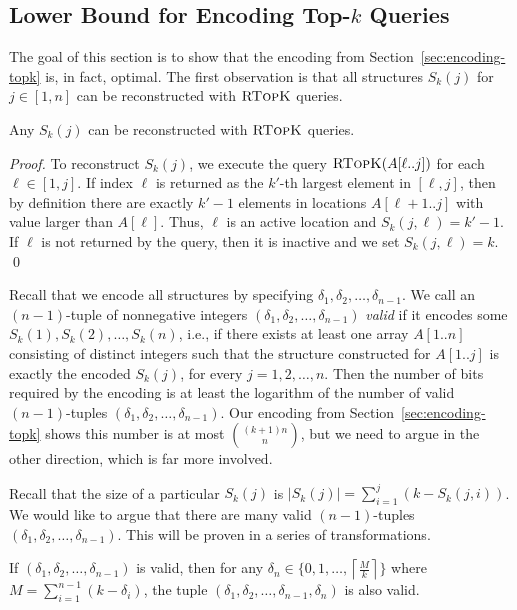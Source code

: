 \documentclass[runningheads]{llncs}
\newcommand{\rtopk}{\textsc{RTopK}}
\begin{document}
\subsection{Lower Bound for Encoding Top-\texorpdfstring{$k$}{k} Queries}

The goal of this section is to show that the encoding from
Section~\ref{sec:encoding-topk} is, in fact, optimal. The first
observation is that all structures $S_k(j)$ for $j \in [1,n]$ can be
reconstructed with $\rtopk$ queries.

\begin{lemma}
\label{lem:reconstruction-topk}
Any $S_k(j)$ can be reconstructed with $\rtopk$ queries.
\end{lemma}

\begin{proof}
To reconstruct $S_k(j)$, we execute the query $\rtopk(A[\ell..j])$ for
each $\ell \in [1,j]$.  If index $\ell$ is returned as the $k'$-th
largest element in $[\ell,j]$, then by definition there are exactly
$k' -1$ elements in locations $A[\ell+1 ..j]$ with value larger than
$A[\ell]$.  Thus, $\ell$ is an active location and $S_k(j,\ell) =
k'-1$.  If $\ell$ is not returned by the query, then it is inactive
and we set $S_k(j,\ell) = k$.  \qed
\end{proof}

Recall that we encode all structures by specifying
$\delta_{1},\delta_{2},\ldots,\delta_{n-1}$.  We call an $(n-1)$-tuple
of nonnegative integers $(\delta_{1},\delta_{2},\ldots,\delta_{n-1})$
\emph{valid} if it encodes some $S_k(1),S_k(2),\ldots,S_k(n)$, i.e.,
if there exists at least one array $A[1..n]$ consisting of distinct
integers such that the structure constructed for $A[1..j]$ is exactly
the encoded $S_k(j)$, for every $j=1,2,\ldots,n$. Then the number of
bits required by the encoding is at least the logarithm of the number
of valid $(n-1)$-tuples
$(\delta_{1},\delta_{2},\ldots,\delta_{n-1})$. Our encoding from
Section~\ref{sec:encoding-topk} shows this number is at most
$\binom{(k+1)n}{n}$, but we need to argue in the other direction,
which is far more involved.

Recall that the size of a particular $S_k(j)$ is $|S_k(j)| = \sum_{i =
  1}^{j} (k - S_k(j,i))$.  We would like to argue that there are many
valid $(n-1)$-tuples $(\delta_1,\delta_2,\ldots,\delta_{n-1})$.  This
will be proven in a series of transformations.

\begin{lemma}
\label{lem:valid-tuple-topk}
If $(\delta_{1},\delta_{2},\ldots,\delta_{n-1})$ is valid, then for
any $\delta_{n}\in\{0,1,\ldots,\left\lceil\frac{M}{k}\right\rceil\}$
where $M = \sum_{i=1}^{n-1}(k-\delta_{i})$, the tuple
$(\delta_{1},\delta_{2},\ldots,\delta_{n-1},\delta_{n})$ is also
valid.
\end{lemma}
\end{document}
